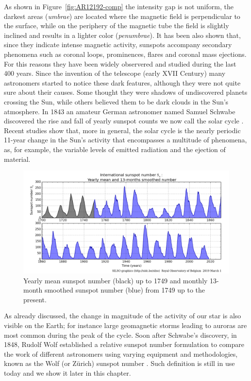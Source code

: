 \bigbreak
\noindent As shown in Figure~\ref{fig:AR12192-comp} the intensity gap is not uniform, the darkest areas (\textit{umbrae}) are located where the magnetic field is perpendicular to the surface, while on the periphery of the magnetic tube the field is slightly inclined and results in a lighter color (\textit{penumbrae}).
\bigbreak
\noindent It has been also shown that, since they indicate intense magnetic activity, sunspots accompany secondary phenomena such as coronal loops, prominences, flares and coronal mass ejections. For this reasons they have been widely observered and studied during the last 400 years.
\bigbreak
\noindent Since the invention of the telescope \cite{king2003history} (early XVII Century) many astronomers started to notice these dark features, although they were not quite sure about their causes. Some thought they were shadows of undiscovered planets crossing the Sun, while others believed them to be dark clouds in the Sun's atmosphere. In 1843 an amateur German astronomer named Samuel Schwabe discovered the rise and fall of yearly sunspot counts we now call the solar cycle \cite{schwabe1843solar}. Recent studies show that, more in general, the solar cycle is the nearly periodic 11-year change in the Sun's activity that encompasses a multitude of phenomena, as, for example, the variable levels of emitted radiation and the ejection of material.
\bigbreak
\begin{figure}[t]
    \centering
    \captionsetup{justification=centering}
    \includegraphics[width=\textwidth]{./pictures/SILSO2}
    \caption{Yearly mean sunspot number (black) up to 1749 and monthly 13-month smoothed sunspot number (blue) from 1749 up to the present.\cite{silso-graph}}
    \label{fig:SILSO2}
\end{figure}
\noindent As already discussed, the change in magnitude of the activity of our star is also visible on the Earth; for instance large geomagnetic storms leading to auroras are most common during the peak of the cycle. Soon after Schwabe's discovery, in 1848, Rudolf Wolf established a relative sunspot number formulation to compare the work of different astronomers using varying equipment and methodologies, known as the Wolf (or Z\"{u}rich) sunspot number \cite{vaquero2007historical}. Such definition is still in use today and we show it later in this chapter.
